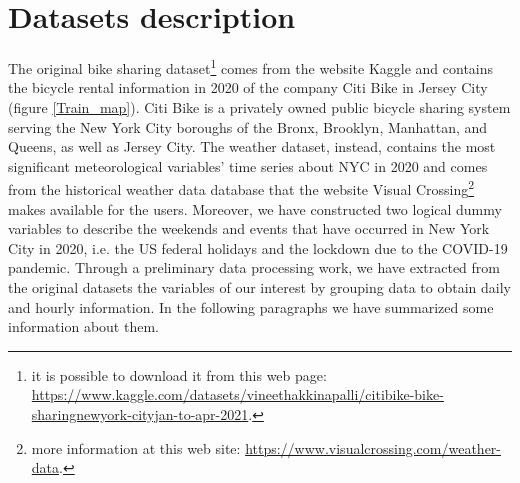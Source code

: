 \section{Datasets description}
The original bike sharing dataset\footnote{it is possible to download it from this web page: \url{https://www.kaggle.com/datasets/vineethakkinapalli/citibike-bike-sharingnewyork-cityjan-to-apr-2021}.} comes from the website Kaggle and contains the bicycle rental information in \num{2020} of the company Citi Bike in Jersey City (figure \ref{Train_map}). Citi Bike is a privately owned public bicycle sharing system serving the New York City boroughs of the Bronx, Brooklyn, Manhattan, and Queens, as well as Jersey City. The weather dataset, instead, contains the most significant meteorological variables' time series about NYC in \num{2020} and comes from the historical weather data database that the website Visual Crossing\footnote{more information at this web site: \url{https://www.visualcrossing.com/weather-data}.} makes available for the users. Moreover, we have constructed two logical dummy variables to describe the weekends and events that have occurred in New York City in \num{2020}, i.e. the US federal holidays and the lockdown due to the COVID-\num{19} pandemic.
Through a preliminary data processing work, we have extracted from the original datasets the variables of our interest by grouping data to obtain daily and hourly information. In the following paragraphs we have summarized some information about them.

